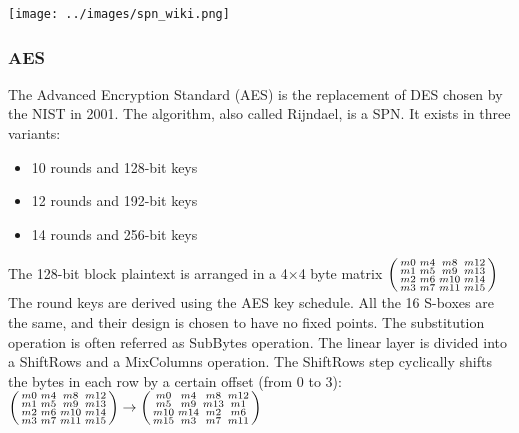 \documentclass[11pt]{sdm}
\begin{document}
\begin{center}
    \texttt{[image: ../images/spn\_wiki.png]}
    \captionsetup{hypcap=false}
    \label{fig_spn}
\end{center}

\subsubsection{AES}

The Advanced Encryption Standard (AES) is the replacement of DES chosen by the NIST in 2001.
The algorithm, also called Rijndael, is a SPN. It exists in three variants:
\begin{itemize}
    \item 10 rounds and 128-bit keys
    \item 12 rounds and 192-bit keys
    \item 14 rounds and 256-bit keys
\end{itemize}

The 128-bit block plaintext is arranged in a 4$\times$4 byte matrix
$\begin{psmallmatrix}
    m0 & m4 & m8 & m12 \\
    m1 & m5 & m9 & m13 \\
    m2 & m6 & m10 & m14 \\
    m3 & m7 & m11 & m15
\end{psmallmatrix}$
The round keys are derived using the AES key schedule.
All the 16 S-boxes are the same, and their design is chosen to have no fixed points.
The substitution operation is often referred as SubBytes operation.
The linear layer is divided into a ShiftRows and a MixColumns operation.
The ShiftRows step cyclically shifts the bytes in each row by a certain offset (from 0 to 3):
$\begin{psmallmatrix}
    m0 & m4 & m8 & m12 \\
    m1 & m5 & m9 & m13 \\
    m2 & m6 & m10 & m14 \\
    m3 & m7 & m11 & m15
\end{psmallmatrix}
\rightarrow
\begin{psmallmatrix}
    m0 & m4 & m8 & m12 \\
    m5 & m9 & m13 & m1 \\
    m10 & m14 & m2 & m6 \\
    m15 & m3 & m7 & m11 \\
\end{psmallmatrix}$
\end{document}
